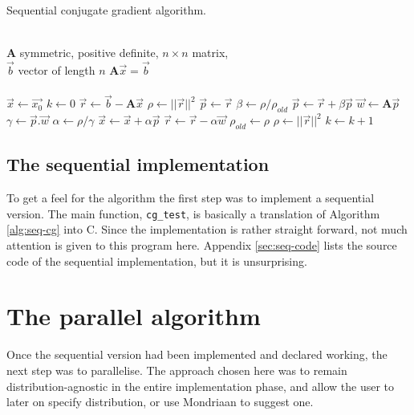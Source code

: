 \documentclass[a4paper]{article}
\newcommand{\ve}[1]{\ensuremath{\vec{#1}}}
\newcommand{\mat}[1]{\ensuremath{\boldsymbol{#1}}}
\begin{document}
\begin{algorithm}
    \caption{Sequential conjugate gradient algorithm.}
\label{alg:seq-cg}
\begin{algorithmic}
    \REQUIRE ~\\
             $\mat A$ symmetric, positive definite, $n\times n$ matrix,\\
             $\ve  b$ vector of length $n$
    \ENSURE  $\mat A \ve x = \ve b$\\~\\
    \STATE $\ve x \leftarrow \ve{x_0}$ 
    \STATE $k \leftarrow 0$ 
    \STATE $\ve r \leftarrow \ve b - \mat A \ve x$
    \STATE $\rho \leftarrow ||\ve r||^2$
    \WHILE{$\sqrt{\rho} > \epsilon ||\ve b|| \wedge k < k_{max}$}
            \STATE $\ve p \leftarrow \ve r$
        \ELSE
            \STATE $\beta \leftarrow \rho/\rho_{old}$
            \STATE $\ve p \leftarrow \ve r + \beta \ve p$
        \ENDIF
        \STATE $\vec w \leftarrow \mat A \ve p$
        \STATE $\gamma \leftarrow \ve p . \ve w$
        \STATE $\alpha \leftarrow \rho/\gamma$
        \STATE $\ve x  \leftarrow \ve x + \alpha \ve p$
        \STATE $\ve r  \leftarrow \ve r - \alpha \ve w$
        \STATE $\rho_{old} \leftarrow \rho$
        \STATE $\rho   \leftarrow || \ve r || ^2$
        \STATE $k \leftarrow k+1$
    \ENDWHILE
\end{algorithmic}
\end{algorithm}


\subsection{The sequential implementation}

To get a feel for the algorithm the first step was to implement a sequential
version. The main function, \texttt{cg\_test}, is basically a translation of
Algorithm \ref{alg:seq-cg} into C. Since the implementation is rather straight
forward, not much attention is given to this program here. Appendix \ref{sec:seq-code}
lists the source code of the sequential implementation, but it is unsurprising.

\section{The parallel algorithm}

Once the sequential version had been implemented and declared working, the next
step was to parallelise. The approach chosen here was to remain distribution-agnostic
in the entire implementation phase, and allow the user to later on specify distribution,
or use Mondriaan to suggest one.
\end{document}
